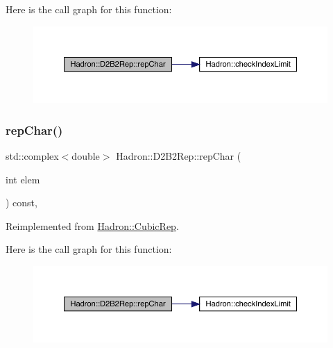 Here is the call graph for this function\+:
\nopagebreak
\begin{figure}[H]
\begin{center}
\leavevmode
\includegraphics[width=350pt]{d3/dbb/structHadron_1_1D2B2Rep_ac6671e025a80770e2dc48904f7e78398_cgraph}
\end{center}
\end{figure}
\mbox{\label{structHadron_1_1D2B2Rep_ac6671e025a80770e2dc48904f7e78398}} 
\subsubsection{\texorpdfstring{repChar()}{repChar()}\hspace{0.1cm}{\footnotesize\ttfamily [2/2]}}
{\footnotesize\ttfamily std\+::complex$<$double$>$ Hadron\+::\+D2\+B2\+Rep\+::rep\+Char (\begin{DoxyParamCaption}\item[{int}]{elem }\end{DoxyParamCaption}) const\hspace{0.3cm}{\ttfamily [inline]}, {\ttfamily [virtual]}}



Reimplemented from \mbox{\hyperlink{structHadron_1_1CubicRep_af45227106e8e715e84b0af69cd3b36f8}{Hadron\+::\+Cubic\+Rep}}.

Here is the call graph for this function\+:
\nopagebreak
\begin{figure}[H]
\begin{center}
\leavevmode
\includegraphics[width=350pt]{d3/dbb/structHadron_1_1D2B2Rep_ac6671e025a80770e2dc48904f7e78398_cgraph}
\end{center}
\end{figure}
\mbox{\label{structHadron_1_1D2B2Rep_a0e46bb79c1d9429a207f9f82eef59450}} 
